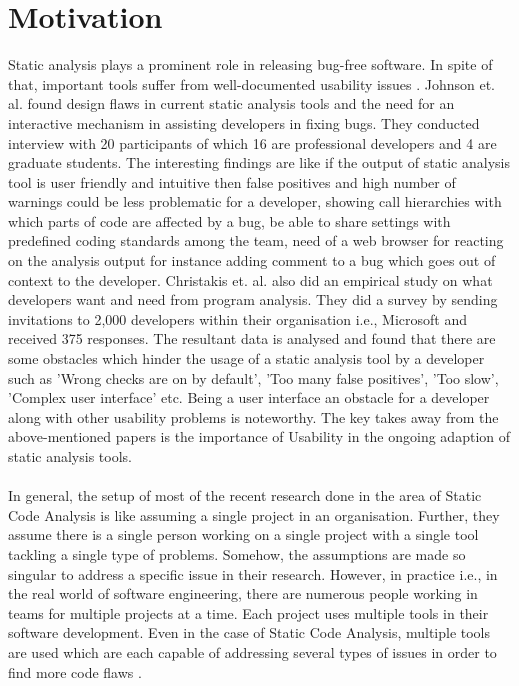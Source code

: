 \chapter{Motivation}
\label{ch:motivation}

Static analysis plays a prominent role in releasing bug-free software. In spite of that, important tools suffer from well-documented usability issues \cite{CB16,JSMB13}. Johnson et. al. \cite{JSMB13}  found design flaws in current static analysis tools and the need for an interactive mechanism in assisting developers in fixing bugs. They conducted interview with 20 participants of which 16 are professional developers and 4 are graduate students. The interesting findings are like if the output of static analysis tool is user friendly and intuitive then false positives and high number of warnings could be less problematic for a developer, showing call hierarchies with which parts of code are affected by a bug, be able to share settings with predefined coding standards among the team, need of a web browser for reacting on the analysis output for instance adding comment to a bug which goes out of context to the developer. Christakis et. al. \cite{CB16} also did an empirical study on what developers want and need from program analysis. They did a survey by sending invitations to 2,000 developers within their organisation i.e., Microsoft and received 375 responses. The resultant data is analysed and found that there are some obstacles which hinder the usage of a static analysis tool by a developer such as 'Wrong checks are on by default', 'Too many false positives', 'Too slow',  'Complex user interface' etc. Being a user interface an obstacle for a developer along with other usability problems is noteworthy. The key takes away from the above-mentioned papers is the importance of Usability in the ongoing adaption of static analysis tools. \\ \\ 

In general, the setup of most of the recent research \cite{CB16} \cite{JSMB13} done in the area of Static Code Analysis is like assuming a single project in an organisation. Further, they assume there is a single person working on a single project with a single tool tackling a single type of problems.  Somehow, the assumptions are made so singular to address a specific issue in their research. However, in practice i.e., in the real world of software engineering, there are numerous people working in teams for multiple projects at a time. Each project uses multiple tools in their software development. Even in the case of Static Code Analysis, multiple tools are used which are each capable of addressing several types of issues in order to find more code flaws \cite{SCALe}. \\ \\



